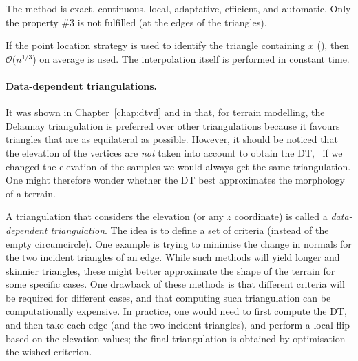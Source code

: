 The method is exact, continuous, local, adaptative, efficient, and automatic.
Only the property \#3 is not fulfilled (at the edges of the triangles).

If the point location strategy is used to identify the triangle containing $x$ (), then $\mathcal{O}(n^{1/3}$) on average is used.
The interpolation itself is performed in constant time.


\paragraph{Data-dependent triangulations.}
It was shown in Chapter~\ref{chap:dtvd} and in  that, for terrain modelling, the Delaunay triangulation is preferred over other triangulations because it favours triangles that are as equilateral as possible.
However, it should be noticed that the elevation of the vertices are \emph{not} taken into account to obtain the DT, \ie\ if we changed the elevation of the samples we would always get the same triangulation.
One might therefore wonder whether the DT best approximates the morphology of a terrain.

A triangulation that considers the elevation (or any $z$ coordinate) is called a \emph{data-dependent triangulation}.
The idea is to define a set of criteria (instead of the empty circumcircle).
One example is trying to minimise the change in normals for the two incident triangles of an edge.
While such methods will yield longer and skinnier triangles, these might better approximate the shape of the terrain for some specific cases.
One drawback of these methods is that different criteria will be required for different cases, and that computing such triangulation can be computationally expensive.
In practice, one would need to first compute the DT, and then take each edge (and the two incident triangles), and perform a local flip based on the elevation values; the final triangulation is obtained by optimisation the wished criterion.




